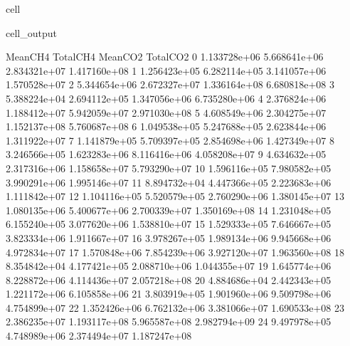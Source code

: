 \documentclass[letterpaper,10pt,english]{jupyterBook}
\begin{document}
\begin{sphinxuseclass}{cell}
\begin{sphinxVerbatimOutput}
\begin{sphinxuseclass}{cell_output}
\begin{sphinxVerbatim}[commandchars=\\\{\}]
        Mean\PYGZus{}CH4     Total\PYGZus{}CH4      Mean\PYGZus{}CO2     Total\PYGZus{}CO2  
0   1.133728e+06  5.668641e+06  2.834321e+07  1.417160e+08  
1   1.256423e+05  6.282114e+05  3.141057e+06  1.570528e+07  
2   5.344654e+06  2.672327e+07  1.336164e+08  6.680818e+08  
3   5.388224e+04  2.694112e+05  1.347056e+06  6.735280e+06  
4   2.376824e+06  1.188412e+07  5.942059e+07  2.971030e+08  
5   4.608549e+06  2.304275e+07  1.152137e+08  5.760687e+08  
6   1.049538e+05  5.247688e+05  2.623844e+06  1.311922e+07  
7   1.141879e+05  5.709397e+05  2.854698e+06  1.427349e+07  
8   3.246566e+05  1.623283e+06  8.116416e+06  4.058208e+07  
9   4.634632e+05  2.317316e+06  1.158658e+07  5.793290e+07  
10  1.596116e+05  7.980582e+05  3.990291e+06  1.995146e+07  
11  8.894732e+04  4.447366e+05  2.223683e+06  1.111842e+07  
12  1.104116e+05  5.520579e+05  2.760290e+06  1.380145e+07  
13  1.080135e+06  5.400677e+06  2.700339e+07  1.350169e+08  
14  1.231048e+05  6.155240e+05  3.077620e+06  1.538810e+07  
15  1.529333e+05  7.646667e+05  3.823334e+06  1.911667e+07  
16  3.978267e+05  1.989134e+06  9.945668e+06  4.972834e+07  
17  1.570848e+06  7.854239e+06  3.927120e+07  1.963560e+08  
18  8.354842e+04  4.177421e+05  2.088710e+06  1.044355e+07  
19  1.645774e+06  8.228872e+06  4.114436e+07  2.057218e+08  
20  4.884686e+04  2.442343e+05  1.221172e+06  6.105858e+06  
21  3.803919e+05  1.901960e+06  9.509798e+06  4.754899e+07  
22  1.352426e+06  6.762132e+06  3.381066e+07  1.690533e+08  
23  2.386235e+07  1.193117e+08  5.965587e+08  2.982794e+09  
24  9.497978e+05  4.748989e+06  2.374494e+07  1.187247e+08  
\end{sphinxVerbatim}

\end{sphinxuseclass}\end{sphinxVerbatimOutput}

\end{sphinxuseclass}
\end{document}
